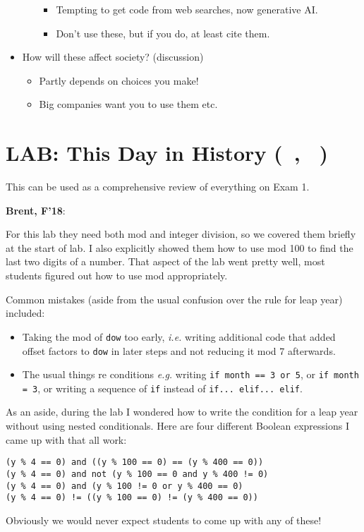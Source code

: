 \documentclass{article}
\newenvironment{reflect}[1]
{
  \noindent
  \begin{lrbox}{\reflectbox}
    \begin{minipage}[t]{\textwidth}
      \textbf{#1}:
}{
    \end{minipage}
  \end{lrbox}
  \fbox{\usebox{\reflectbox}}
}
\newcommand{\notready}{\textcolor{red}{\XSolidBold}\xspace}
\newcommand{\shortmonthname}{\StrLeft{\datemonthname}{3}}
\newcommand{\showdate}{\thedateday\ \shortmonthname}
\newcommand{\lab}[1]{\section*{LAB: #1 (\showdate\nextdate, \showdate)}}
\begin{document}
\begin{itemize}
\begin{itemize}
    \begin{itemize}

    \item
      Tempting to get code from web searches, now generative AI.
    \item
      Don't use these, but if you do, at least cite them.
    \end{itemize}
  \end{itemize}
\item
  How will these affect society? (discussion)

  \begin{itemize}

  \item
    Partly depends on choices you make!
  \item
    Big companies want you to use them etc.
  \end{itemize}
\end{itemize}

\newpage
\lab{\notready This Day in History}

This can be used as a comprehensive review of everything on Exam 1.

\begin{reflect}{Brent, F'18}
  For this lab they need both mod and integer division, so we covered
  them briefly at the start of lab.  I also explicitly showed them how
  to use mod 100 to find the last two digits of a number.  That aspect
  of the lab went pretty well, most students figured out how to use
  mod appropriately.

  Common mistakes (aside from the usual confusion over the rule for
  leap year) included:
  \begin{itemize}
  \item Taking the mod of \verb|dow| too early, \emph{i.e.} writing
    additional code that added offset factors to \verb|dow| in later
    steps and not reducing it mod 7 afterwards.
  \item The usual things re conditions \emph{e.g.} writing \texttt{if month
    == 3 or 5}, or \texttt{if month = 3}, or writing a sequence of
    \verb|if| instead of \texttt{if... elif... elif}.
  \end{itemize}

  As an aside, during the lab I wondered how to write the condition
  for a leap year without using nested conditionals.  Here are four
  different Boolean expressions I came up with that all work:
\begin{verbatim}
(y % 4 == 0) and ((y % 100 == 0) == (y % 400 == 0))
(y % 4 == 0) and not (y % 100 == 0 and y % 400 != 0)
(y % 4 == 0) and (y % 100 != 0 or y % 400 == 0)
(y % 4 == 0) != ((y % 100 == 0) != (y % 400 == 0))
\end{verbatim}
  Obviously we would never expect students to come up with any of these!
\end{reflect}
\end{document}

